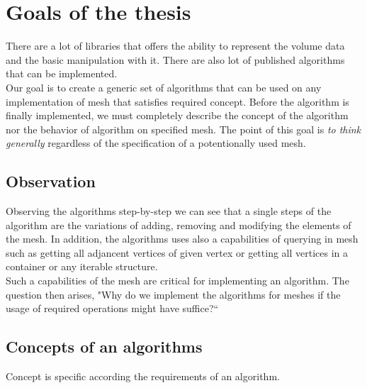 \chapter{Goals of the thesis}

There are a lot of libraries that offers the ability to represent the volume data
and the basic manipulation with it. There are also lot of published algorithms
that can be implemented.\\

Our goal is to create a generic set of algorithms that can be used on any implementation
of mesh that satisfies required concept. Before the algorithm is finally implemented,
we must completely describe the concept of the algorithm nor the behavior of algorithm
on specified mesh. The point of this goal is \emph{to think generally} regardless of
the specification of a potentionally used mesh.\\

\section{Observation}

Observing the algorithms step-by-step we can see that a single steps
of the algorithm are the variations of adding, removing and modifying the elements
of the mesh. In addition, the algorithms uses also a capabilities of querying
in mesh such as getting all adjancent vertices of given vertex or getting all
vertices in a container or any iterable structure.\\

Such a capabilities of the mesh are critical for implementing an algorithm.
The question then arises, "Why do we implement the algorithms for meshes if
the usage of required operations might have suffice?``

\section{Concepts of an algorithms}

Concept is specific according the requirements of an algorithm.